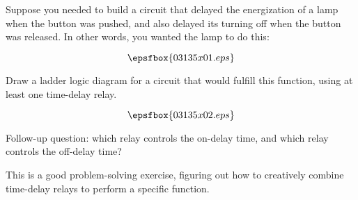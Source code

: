 

Suppose you needed to build a circuit that delayed the energization of a lamp when the button was pushed, and also delayed its turning off when the button was released.  In other words, you wanted the lamp to do this:

$$\epsfbox{03135x01.eps}$$

Draw a ladder logic diagram for a circuit that would fulfill this function, using at least one time-delay relay.







$$\epsfbox{03135x02.eps}$$

\vskip 10pt

Follow-up question: which relay controls the on-delay time, and which relay controls the off-delay time?







This is a good problem-solving exercise, figuring out how to creatively combine time-delay relays to perform a specific function.




